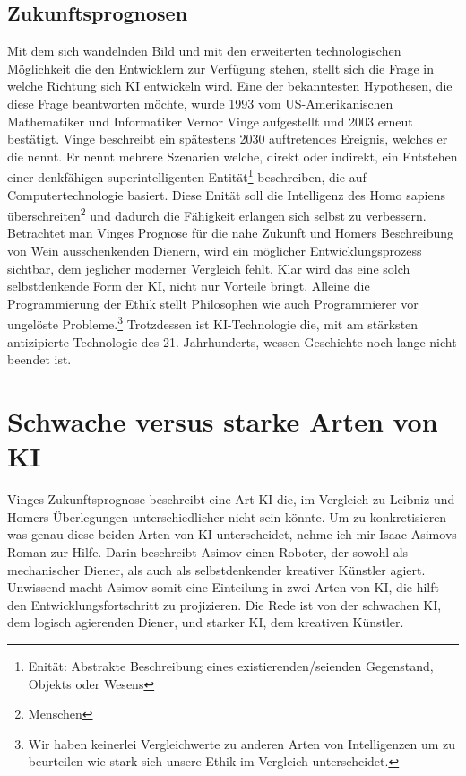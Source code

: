 \documentclass[12pt,german,ngerman]{report}
\begin{document}
    \section{Zukunftsprognosen}
        Mit dem sich wandelnden Bild und mit den erweiterten technologischen Möglichkeit die den Entwicklern zur Verfügung stehen,
        stellt sich die Frage in welche Richtung sich KI entwickeln wird.
        Eine der bekanntesten Hypothesen, die diese Frage beantworten möchte, wurde 1993 vom US-Amerikanischen Mathematiker und 
        Informatiker Vernor Vinge aufgestellt und 2003
        erneut bestätigt. Vinge beschreibt ein spätestens 2030 auftretendes Ereignis, 
        welches er die \cite[1]{vinge1993technological} nennt. 
        Er nennt mehrere Szenarien welche, direkt oder indirekt, 
        ein Entstehen einer denkfähigen superintelligenten Entität\footnote{Enität: Abstrakte Beschreibung eines existierenden/seienden Gegenstand, Objekts oder Wesens}
        beschreiben, die auf Computertechnologie basiert.
        Diese Enität soll die Intelligenz des Homo sapiens überschreiten\footnote{Menschen}
        und dadurch die Fähigkeit erlangen sich selbst zu verbessern.\\

        Betrachtet man Vinges Prognose für die nahe Zukunft
        und Homers Beschreibung von Wein ausschenkenden Dienern,
        wird ein möglicher Entwicklungsprozess sichtbar, dem jeglicher moderner Vergleich fehlt.
        Klar wird das eine solch selbstdenkende Form der KI, nicht nur Vorteile bringt. 
        Alleine die Programmierung der Ethik
        stellt Philosophen wie auch Programmierer
        vor ungelöste Probleme.\footnote{Wir haben keinerlei Vergleichwerte zu anderen Arten von Intelligenzen um zu
        beurteilen wie stark sich unsere Ethik im Vergleich unterscheidet.}
        Trotzdessen ist KI-Technologie die, mit am stärksten antizipierte Technologie des 21. Jahrhunderts,
        wessen Geschichte noch lange nicht beendet ist.




\chapter{Schwache versus starke Arten von KI}
    Vinges Zukunftsprognose\cite[1]{vinge1993technological} beschreibt eine Art KI die,
    im Vergleich zu Leibniz und Homers Überlegungen unterschiedlicher nicht sein könnte.
    Um zu konkretisieren was genau diese beiden Arten von KI unterscheidet, nehme ich
    mir Isaac Asimovs Roman  zur Hilfe.
    Darin beschreibt Asimov einen Roboter, der sowohl als mechanischer Diener, als
    auch als selbstdenkender kreativer Künstler agiert.\cite{asimov2000der}
    Unwissend macht Asimov somit eine Einteilung in zwei Arten von KI,
    die hilft den Entwicklungsfortschritt zu projizieren.
    Die Rede ist von der schwachen KI, dem logisch agierenden Diener, und
    starker KI, dem kreativen Künstler.
\end{document}
